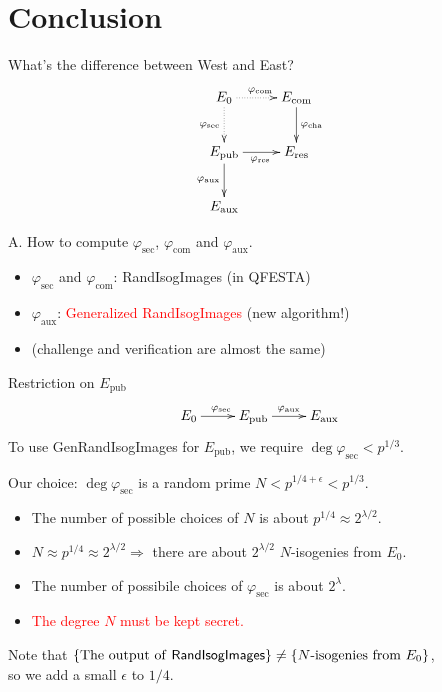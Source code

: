 \documentclass[12pt]{beamer}
\newcommand{\red}[1]{\textcolor{red}{#1}}
\begin{document}
\section{Conclusion}

\begin{frame}{What's the difference between West and East?}
    $$
    \xymatrix{
        E_0 \ar@{..>}[r]^{\varphi_\mathrm{com}} \ar@{..>}[d]_{\varphi_\mathrm{sec}} & E_\mathrm{com} \ar[d]^{\varphi_\mathrm{cha}} \\
        E_\mathrm{pub} \ar[r]_{\varphi_\mathrm{res}} \ar[d]_{\varphi_\mathrm{aux}} & E_\mathrm{res}\\
        E_\mathrm{aux} & 
    }
    $$

    A. How to compute $\varphi_\mathrm{sec}$, $\varphi_\mathrm{com}$ and $\varphi_\mathrm{aux}$.

    \begin{itemize}
        \item $\varphi_\mathrm{sec}$ and $\varphi_\mathrm{com}$: RandIsogImages (in QFESTA)
        \item $\varphi_\mathrm{aux}$: \red{Generalized RandIsogImages} (new algorithm!)
        \item (challenge and verification are almost the same)
    \end{itemize}
\end{frame}



\begin{frame}{Restriction on $E_\mathrm{pub}$}
    \vspace{-10pt}
    $$
        \xymatrix{
            E_0 \ar[r]^{\varphi_\mathrm{sec}} & E_\mathrm{pub} \ar[r]^{\varphi_\mathrm{aux}} & E_\mathrm{aux}
        }
    $$
    To use \textsf{GenRandIsogImages} for $E_\mathrm{pub}$,
    we require $\deg\varphi_\mathrm{sec} < p^{1/3}$.
    
    \vspace*{10pt}
    Our choice: $\deg\varphi_\mathrm{sec}$ is a random prime $N < p^{1/4 + \epsilon} < p^{1/3}$.
    \begin{itemize}
        \item The number of possible choices of $N$ is about $p^{1/4} \approx 2^{\lambda/2}$.
        \item $N \approx p^{1/4} \approx 2^{\lambda/2} \Rightarrow$ there are about $2^{\lambda/2}$ $N$-isogenies from $E_0$.
        \item The number of possibile choices of $\varphi_\mathrm{sec}$ is about $2^{\lambda}$.
        \item \red{The degree $N$ must be kept secret.}
    \end{itemize}

    \vspace*{10pt}
    Note that
    $\{\text{The output of \textsf{RandIsogImages}}\} \neq \{N\text{-isogenies from }E_0\}$,\\
    so we add a small $\epsilon$ to $1/4$.
\end{frame}
\end{document}
